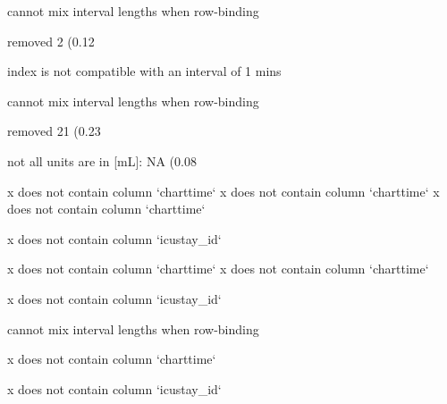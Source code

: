 \documentclass[
]{jss}
\begin{document}
\begin{CodeChunk}
\begin{CodeOutput}
cannot mix interval lengths when row-binding
\end{CodeOutput}

\begin{CodeOutput}
removed 2 (0.12%
\end{CodeOutput}

\begin{CodeOutput}
index is not compatible with an interval of 1 mins
\end{CodeOutput}

\begin{CodeOutput}
cannot mix interval lengths when row-binding
\end{CodeOutput}

\begin{CodeOutput}
removed 21 (0.23%
\end{CodeOutput}

\begin{CodeOutput}
not all units are in [mL]: NA (0.08%
\end{CodeOutput}

\begin{CodeOutput}
x does not contain column `charttime`
x does not contain column `charttime`
x does not contain column `charttime`
\end{CodeOutput}

\begin{CodeOutput}
x does not contain column `icustay_id`
\end{CodeOutput}

\begin{CodeOutput}
x does not contain column `charttime`
x does not contain column `charttime`
\end{CodeOutput}

\begin{CodeOutput}
x does not contain column `icustay_id`
\end{CodeOutput}

\begin{CodeOutput}
cannot mix interval lengths when row-binding
\end{CodeOutput}

\begin{CodeOutput}
x does not contain column `charttime`
\end{CodeOutput}

\begin{CodeOutput}
x does not contain column `icustay_id`
\end{CodeOutput}


\end{CodeChunk}
\end{document}
